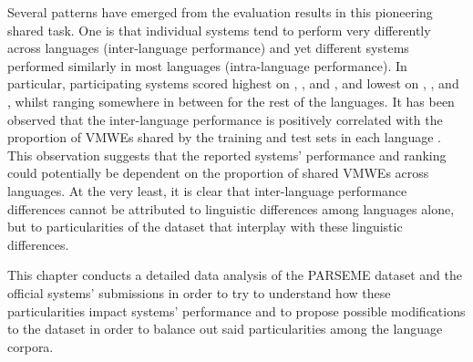 \documentclass[output=paper
,modfonts
,nonflat,draftmode]{langsci/langscibook}
\begin{document}

Several patterns have emerged from the evaluation results in this pioneering shared task. One is that individual systems tend to perform very differently across languages (inter-language performance) and yet different systems performed similarly in most languages (intra-language performance). In particular, participating systems scored highest on , ,  and , and lowest on , ,  and , whilst ranging somewhere in between for the rest of the languages. It has been observed that the inter-language performance is positively correlated with the proportion of VMWEs shared by the training and test sets in each language \citep{maldonado2017}. This observation suggests that the reported systems' performance and ranking could potentially be dependent on the proportion of shared VMWEs across languages. At the very least, it is clear that inter-language performance differences cannot be attributed to linguistic differences among languages alone, but to particularities of the dataset that interplay with these linguistic differences.

This chapter conducts a detailed data analysis of the PARSEME dataset and the official systems' submissions in order to try to understand how these particularities impact systems' performance and to propose possible modifications to the dataset in order to balance out said particularities among the language corpora.
\end{document}
